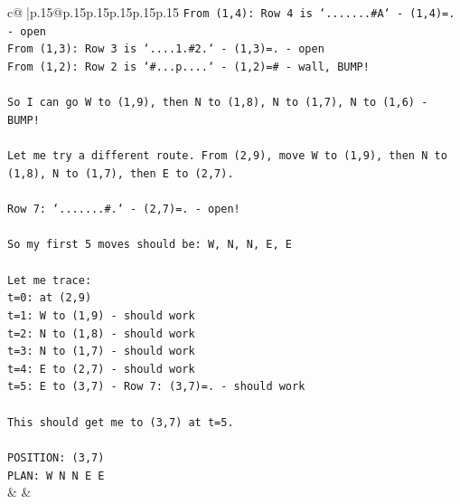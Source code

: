 \documentclass{article}
\begin{document}
{\begin{supertabular}{c@{$\;$}|p{.15\linewidth}@{}p{.15\linewidth}p{.15\linewidth}p{.15\linewidth}p{.15\linewidth}p{.15\linewidth}}
{{{\texttt{From (1,4): Row 4 is `.......\#A` {-} (1,4)=. {-} open} \\
\texttt{From (1,3): Row 3 is `....1.\#2.` {-} (1,3)=. {-} open} \\
\texttt{From (1,2): Row 2 is `\#...p....` {-} (1,2)=\# {-} wall, BUMP!} \\
\\ 
\texttt{So I can go W to (1,9), then N to (1,8), N to (1,7), N to (1,6) {-} BUMP!} \\
\\ 
\texttt{Let me try a different route. From (2,9), move W to (1,9), then N to (1,8), N to (1,7), then E to (2,7).} \\
\\ 
\texttt{Row 7: `.......\#.` {-} (2,7)=. {-} open!} \\
\\ 
\texttt{So my first 5 moves should be: W, N, N, E, E} \\
\\ 
\texttt{Let me trace:} \\
\texttt{t=0: at (2,9)} \\
\texttt{t=1: W to (1,9) {-} should work} \\
\texttt{t=2: N to (1,8) {-} should work} \\
\texttt{t=3: N to (1,7) {-} should work} \\
\texttt{t=4: E to (2,7) {-} should work} \\
\texttt{t=5: E to (3,7) {-} Row 7: (3,7)=. {-} should work} \\
\\ 
\texttt{This should get me to (3,7) at t=5.} \\
\\ 
\texttt{POSITION: (3,7)} \\
\texttt{PLAN: W N N E E} \\
            }
        }
    }
    & & \\ \\


\end{supertabular}}
\end{document}
